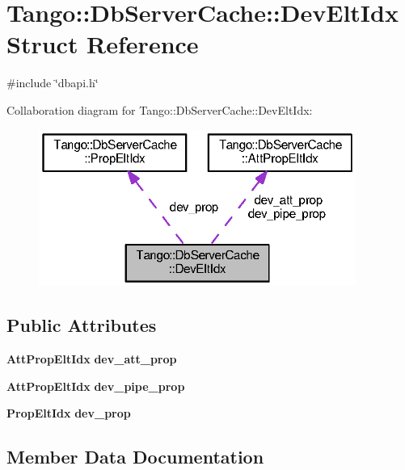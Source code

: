 \section{Tango\-:\-:Db\-Server\-Cache\-:\-:Dev\-Elt\-Idx Struct Reference}
\label{structTango_1_1DbServerCache_1_1DevEltIdx}


{\ttfamily \#include \char`\"{}dbapi.\-h\char`\"{}}



Collaboration diagram for Tango\-:\-:Db\-Server\-Cache\-:\-:Dev\-Elt\-Idx\-:
\nopagebreak
\begin{figure}[H]
\begin{center}
\leavevmode
\includegraphics[width=294pt]{dd/d57/structTango_1_1DbServerCache_1_1DevEltIdx__coll__graph}
\end{center}
\end{figure}
\subsection*{Public Attributes}
\begin{DoxyCompactItemize}
\item 
{\bf Att\-Prop\-Elt\-Idx} {\bf dev\-\_\-att\-\_\-prop}
\item 
{\bf Att\-Prop\-Elt\-Idx} {\bf dev\-\_\-pipe\-\_\-prop}
\item 
{\bf Prop\-Elt\-Idx} {\bf dev\-\_\-prop}
\end{DoxyCompactItemize}


\subsection{Member Data Documentation}
